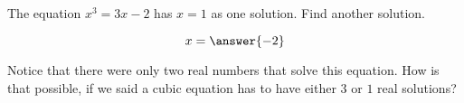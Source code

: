 \documentclass{ximera}
\begin{document}
\begin{problem}

	The equation $x^3 = 3x-2$ has $x=1$ as one solution.  Find another solution.
	
	\begin{prompt}
		\[ x= \answer{-2} \]
	\end{prompt}
	\begin{feedback}
  		Notice that there were only two real numbers that solve this equation.  How is that possible, if we said a cubic equation has to have either
		$3$ or $1$ real solutions?
  	\end{feedback}
\end{problem}
\end{document}
